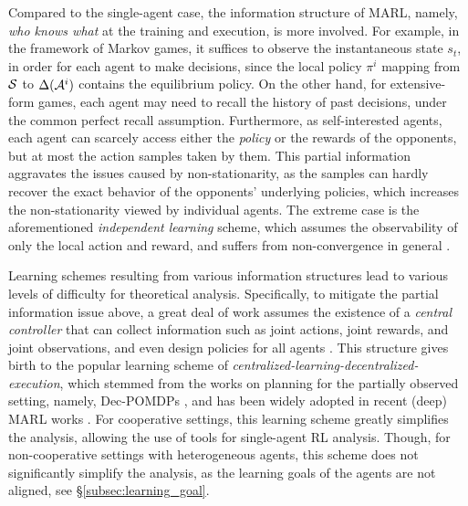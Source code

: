 Compared to the single-agent case, the information structure of MARL, namely, \emph{who knows what} at the training and execution, is more involved. For example,  in the framework of Markov games, it suffices to observe the instantaneous state $s_t$, in order for each agent to make decisions, since the local policy $\pi^i$ mapping from ${\mathcal{S}}$ to $\Delta(\mathcal{A}^i)$ contains the equilibrium policy. On the other hand, for extensive-form games, each agent may need to recall the history of  past decisions, under the common perfect recall assumption. 
Furthermore, as self-interested agents, each agent can scarcely  access either the \emph{policy} or the rewards of the opponents, but at most the  action samples taken by them. This partial information aggravates the issues caused by non-stationarity, as the samples can hardly recover the exact behavior of the opponents' underlying policies, which increases the non-stationarity viewed by individual agents. The extreme case is the aforementioned \emph{independent learning} scheme, which assumes the observability of  only the local action and reward, and suffers from non-convergence in general \cite{tan1993multi}.   


Learning schemes resulting  from various 
information structures lead to various levels of difficulty  for theoretical analysis. Specifically, to mitigate the partial information issue above, a great deal of work  assumes the existence of a \emph{central controller} that can 
collect information such as joint actions, joint rewards, and joint observations,  and even 
design policies for all agents \cite{hansen2004dynamic,oliehoek2014dec,lowe2017multi,foerster2017stabilising,gupta2017cooperative,foerster2018counterfactual,dibangoye2018learning,chen2018communication,rashid2018qmix}. This structure gives birth to the popular learning scheme of \emph{centralized-learning-decentralized-execution}, which stemmed  from the works on planning for the partially observed setting, namely, Dec-POMDPs  \cite{hansen2004dynamic,oliehoek2014dec,kraemer2016multi}, and has been widely adopted in recent (deep) MARL works \cite{lowe2017multi,foerster2017stabilising,gupta2017cooperative,foerster2018counterfactual,chen2018communication,rashid2018qmix}. For cooperative settings, this learning scheme greatly simplifies the analysis, 
allowing the use of tools for   single-agent RL analysis. Though, for non-cooperative settings with heterogeneous agents, this scheme does not significantly simplify the analysis, as the learning goals of the agents are not aligned, see \S\ref{subsec:learning_goal}.  

